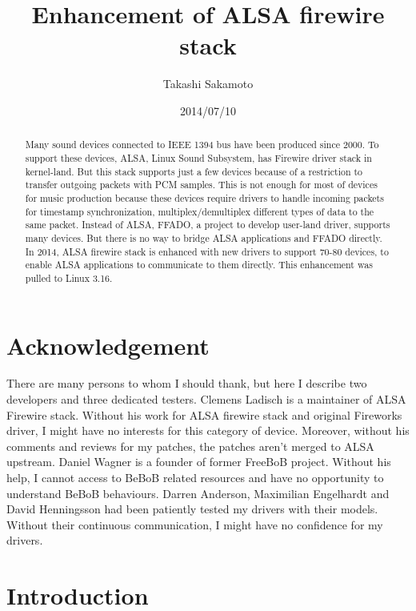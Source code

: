 \documentclass[onecolumn]{article}
\begin{document}
\title{Enhancement of ALSA firewire stack}
\author{Takashi Sakamoto}
\date{2014/07/10}
\maketitle{}

\begin{abstract}

Many sound devices connected to IEEE 1394 bus have been produced since 2000. To support these devices, ALSA, Linux Sound Subsystem, has Firewire driver stack in kernel-land. But this stack supports just a few devices because of a restriction to transfer outgoing packets with PCM samples. This is not enough for most of devices for music production because these devices require drivers to handle incoming packets for timestamp synchronization, multiplex/demultiplex different types of data to the same packet. Instead of ALSA, FFADO, a project to develop user-land driver, supports many devices. But there is no way to bridge ALSA applications and FFADO directly. In 2014, ALSA firewire stack is enhanced with new drivers to support 70-80 devices, to enable ALSA applications to communicate to them directly. This enhancement was pulled to Linux 3.16.

\end{abstract}

\section*{Acknowledgement}

There are many persons to whom I should thank, but here I describe two developers and three dedicated testers. Clemens Ladisch is a maintainer of ALSA Firewire stack. Without his work for ALSA firewire stack and original Fireworks driver, I might have no interests for this category of device. Moreover, without his comments and reviews for my patches, the patches aren't merged to ALSA upstream. Daniel Wagner is a founder of former FreeBoB project. Without his help, I cannot access to BeBoB related resources and have no opportunity to understand BeBoB behaviours. Darren Anderson, Maximilian Engelhardt and David Henningsson had been patiently tested my drivers with their models. Without their continuous communication, I might have no confidence for my drivers.


\section{Introduction}
\end{document}
